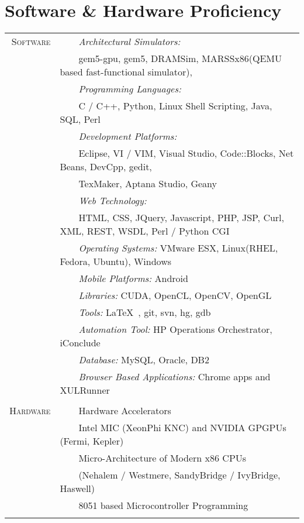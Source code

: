 \documentclass[a4paper,10pt]{article} %
\newcommand{\tabitem}{~~\llap{\textbullet}~~}
\begin{document}
\newpage

\section{Software \& Hardware Proficiency}
\begin{tabular}{rl}
	\textsc{Software} & \tabitem \textit{Architectural Simulators:}\\
	& ~~~~gem5-gpu, gem5, DRAMSim, MARSSx86(QEMU based fast-functional simulator),\\
	& \tabitem \textit{Programming Languages:}\\
	& ~~~~C / C++, Python, Linux Shell Scripting, Java, SQL, Perl\\
	& \tabitem \textit{Development Platforms:} \\
	& ~~~~Eclipse, VI / VIM, Visual Studio, Code::Blocks, Net Beans, DevCpp, gedit,\\
	& ~~~~TexMaker, Aptana Studio, Geany\\
	& \tabitem \textit{Web Technology:} \\
	& ~~~~HTML, CSS, JQuery, Javascript, PHP, JSP, Curl, XML, REST, WSDL, Perl / Python CGI\\
	& \tabitem \textit{Operating Systems:} VMware ESX, Linux(RHEL, Fedora, Ubuntu), Windows \\
	& \tabitem \textit{Mobile Platforms:} Android \\
	& \tabitem \textit{Libraries:} CUDA, OpenCL, OpenCV, OpenGL  \\
	& \tabitem \textit{Tools:} \LaTeX\ , git, svn, hg, gdb\\
	& \tabitem \textit{Automation Tool:} HP Operations Orchestrator, iConclude \\
	& \tabitem \textit{Database:} MySQL, Oracle, DB2 \\
	& \tabitem \textit{Browser Based Applications:} Chrome apps and XULRunner \\

	&\\

	\textsc{Hardware}  & \tabitem Hardware Accelerators \\
	& ~~~~Intel MIC (XeonPhi KNC) and NVIDIA GPGPUs (Fermi, Kepler) \\
	& \tabitem Micro-Architecture of Modern x86 CPUs\\
	& ~~~~(Nehalem / Westmere, SandyBridge / IvyBridge, Haswell) \\
	& \tabitem 8051 based Microcontroller Programming \\
	&\\
\end{tabular}
\\
\end{document}
